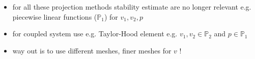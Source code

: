 \begin{itemize}
	\item for all these projection methods stability estimate are no longer relevant e.g. piecewise linear functions ($\mathbb{P}_1$) for $v_1,v_2,p$
	\item for coupled system use e.g. Taylor-Hood element e.g. $v_1,v_2 \in \mathbb{P}_2$ and $ p \in \mathbb{P}_1$
	\item way out is to use different meshes, finer meshes for $v$ !
\end{itemize}